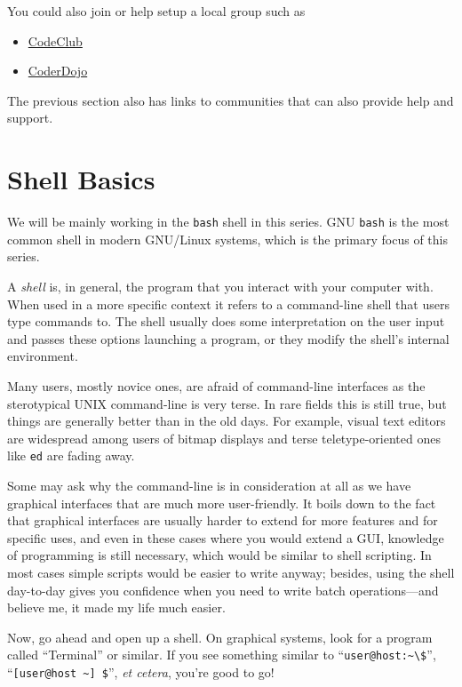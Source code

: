 \documentclass{extbook}
\begin{document}
You could also join or help setup a local group such as 

\begin{itemize}
\item \href{https://www.codeclub.org.uk}{CodeClub} 
\item \href{https://coderdojo.com/}{CoderDojo}
\end{itemize}

The previous section also has links to communities that can also provide help and support.  


\chapter{Shell Basics}

We will be mainly working in the \texttt{bash} shell in this series.  GNU \texttt{bash} is the most common shell in modern GNU/Linux systems, which is the primary focus of this series.

A \textit{shell} is, in general, the program that you interact with your computer with.  When used in a more specific context it refers to a command-line shell that users type commands to.  The shell usually does some interpretation on the user input and passes these options launching a program, or they modify the shell's internal environment.

Many users, mostly novice ones, are afraid of command-line interfaces as the sterotypical UNIX command-line is very terse.  In rare fields this is still true, but things are generally better than in the old days.  For example, visual text editors are widespread among users of bitmap displays and terse teletype-oriented ones like \texttt{ed} are fading away.

Some may ask why the command-line is in consideration at all as we have graphical interfaces that are much more user-friendly.  It boils down to the fact that graphical interfaces are usually harder to extend for more features and for specific uses, and even in these cases where you would extend a GUI, knowledge of programming is still necessary, which would be similar to shell scripting.  In most cases simple scripts would be easier to write anyway; besides, using the shell day-to-day gives you confidence when you need to write batch operations---and believe me, it made my life much easier.

Now, go ahead and open up a shell.  On graphical systems, look for a program called ``Terminal'' or similar.  If you see something similar to ``\verb|user@host:~\$|'', ``\verb|[user@host ~] $|'', \textit{et cetera}, you're good to go!
\end{document}
